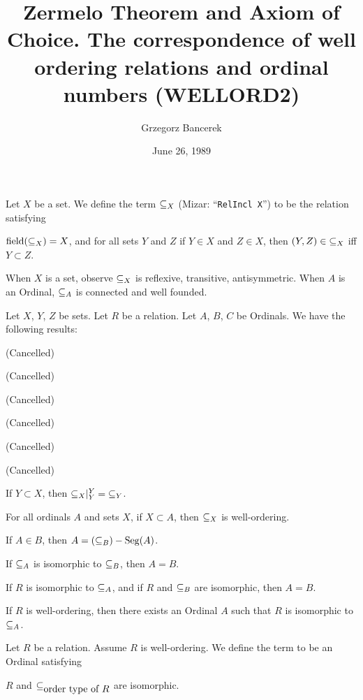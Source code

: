 \documentclass{article}
\title[Zermelo Theorem and Axiom of Choice (WELLORD2)]{Zermelo Theorem and Axiom of Choice. The correspondence of well ordering relations and ordinal numbers (WELLORD2)}
\author{Grzegorz Bancerek}
\date{June 26, 1989}
\begin{document}
\maketitle

\begin{definition}
Let $X$ be a set. We define the term $\mathord{\subseteq_{X}}$ (Mizar:
``\verb#RelIncl X#'') to be the relation satisfying
\begin{defn}
\item $\operatorname{field}(\mathord{\subseteq_{X}})=X$, and for all sets $Y$ and $Z$ if $Y\in X$
and $Z\in X$, then $(Y,Z)\in\mathord{\subseteq_{X}}$ iff $Y\subset Z$.
\end{defn}
\end{definition}
When $X$ is a set, observe $\mathord{\subseteq_{X}}$ is reflexive, transitive, antisymmetric.
When $A$ is an Ordinal, $\mathord{\subseteq_{A}}$ is connected and well founded.

Let $X$, $Y$, $Z$ be sets. Let $R$ be a relation. Let $A$, $B$, $C$ be Ordinals.
We have the following results:
\begin{thm}
\item\label{wellord2:1} (Cancelled)
\item\label{wellord2:2} (Cancelled)
\item\label{wellord2:3} (Cancelled)
\item\label{wellord2:4} (Cancelled)
\item\label{wellord2:5} (Cancelled)
\item\label{wellord2:6} (Cancelled)
\item\label{wellord2:7} If $Y\subset X$, then $\mathord{\subseteq_{X}}|^{Y}_{Y}=\mathord{\subseteq_{Y}}$.
\item\label{wellord2:8} For all ordinals $A$ and sets $X$,
  if $X\subset A$, then $\mathord{\subseteq_{X}}$ is well-ordering.
\item\label{wellord2:9} If $A\in B$, then $A=(\mathord{\subseteq_{B}})-\operatorname{Seg}(A)$.
\item\label{wellord2:10} If $\mathord{\subseteq_{A}}$ is isomorphic to $\mathord{\subseteq_{B}}$,
  then $A=B$.
\item\label{wellord2:11} If $R$ is isomorphic to $\mathord{\subseteq_{A}}$,
  and if $R$ and $\mathord{\subseteq_{B}}$ are isomorphic,
  then $A=B$.
\item\label{wellord2:12} If $R$ is well-ordering, then there exists an
  Ordinal $A$ such that $R$ is isomorphic to $\mathord{\subseteq_{A}}$.
\item\label{wellord2:13} 
\end{thm}

\begin{definition}
Let $R$ be a relation. Assume $R$ is well-ordering.
We define the term  to be an Ordinal
satisfying
\begin{defn}
\item $R$ and $\mathord{\subseteq_{\mbox{order type of $R$}}}$ are isomorphic.
\end{defn}
\end{definition}
\end{document}
